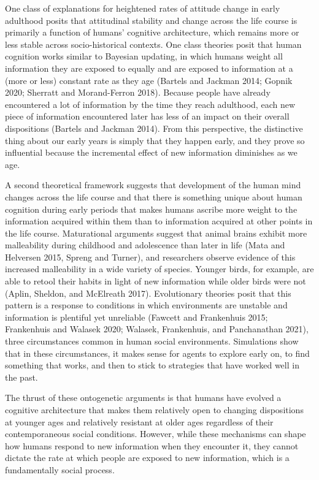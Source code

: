 \documentclass[
  12pt,
]{article}
\begin{document}
One class of explanations for heightened rates of attitude change in early adulthood posits that attitudinal stability and change across the life course is primarily a function of humans' cognitive architecture, which remains more or less stable across socio-historical contexts. One class theories posit that human cognition works similar to Bayesian updating, in which humans weight all information they are exposed to equally and are exposed to information at a (more or less) constant rate as they age (Bartels and Jackman 2014; Gopnik 2020; Sherratt and Morand-Ferron 2018). Because people have already encountered a lot of information by the time they reach adulthood, each new piece of information encountered later has less of an impact on their overall dispositions (Bartels and Jackman 2014). From this perspective, the distinctive thing about our early years is simply that they happen early, and they prove so influential because the incremental effect of new information diminishes as we age.

A second theoretical framework suggests that development of the human mind changes across the life course and that there is something unique about human cognition during early periods that makes humans ascribe more weight to the information acquired within them than to information acquired at other points in the life course. Maturational arguments suggest that animal brains exhibit more malleability during childhood and adolescence than later in life (Mata and Helversen 2015, Spreng and Turner), and researchers observe evidence of this increased malleability in a wide variety of species. Younger birds, for example, are able to retool their habits in light of new information while older birds were not (Aplin, Sheldon, and McElreath 2017). Evolutionary theories posit that this pattern is a response to conditions in which environments are unstable and information is plentiful yet unreliable (Fawcett and Frankenhuis 2015; Frankenhuis and Walasek 2020; Walasek, Frankenhuis, and Panchanathan 2021), three circumstances common in human social environments. Simulations show that in these circumstances, it makes sense for agents to explore early on, to find something that works, and then to stick to strategies that have worked well in the past.

The thrust of these ontogenetic arguments is that humans have evolved a cognitive architecture that makes them relatively open to changing dispositions at younger ages and relatively resistant at older ages regardless of their contemporaneous social conditions. However, while these mechanisms can shape how humans respond to new information when they encounter it, they cannot dictate the rate at which people are exposed to new information, which is a fundamentally social process.
\end{document}
